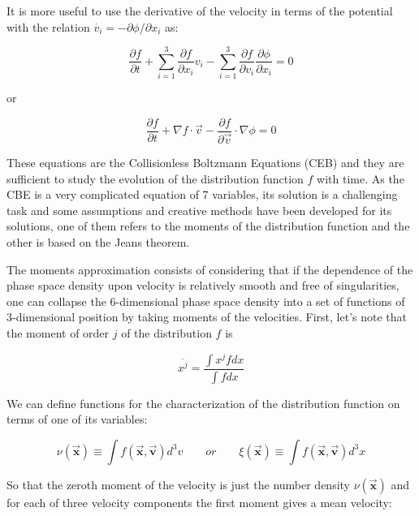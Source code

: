 It is more useful to use the derivative of the velocity in terms of the potential with the relation $\dot{v_{i}}=-\partial\phi / \partial x_{i}$ as:

\begin{equation}
\frac{\partial f}{\partial t}+\sum_{i=1}^{3}\frac{\partial f}{\partial x_{i}}v_{i}-\sum_{i=1}^{3}\frac{\partial f}{\partial v_{i}}\frac{\partial\phi}{\partial x_{i}}=0
\end{equation}

or

\begin{equation}
\frac{\partial f}{\partial t}+\nabla f\cdot\vec{v}-\frac{\partial f}{\partial\overrightarrow{v}}\cdot\nabla\phi=0
\end{equation}

These equations are the Collisionless Boltzmann Equations (CEB) and they are sufficient to study the evolution of the distribution function $f$ with time. As the CBE is a very complicated equation of 7 variables, its solution is a challenging task and some assumptions and creative methods have been developed for its solutions, one of them refers to the moments of the distribution function and the other is based on the Jeans theorem.

The moments approximation consists of considering that if the dependence of the phase space density upon velocity is relatively smooth and free of singularities, one can collapse the 6-dimensional phase space density into a set of functions of 3-dimensional position by taking moments of the velocities. First, let's note that the moment of order $j$ of the distribution $f$ is

\begin{equation}
\overline{x^{j}}=\frac {\int x^{j}fdx}{\int fdx}
\end{equation}

We can define functions for the characterization of the distribution function on terms of one of its variables:

\begin{equation}
\nu(\vec{\textbf{x}})\equiv \int f(\vec{\textbf{x}},\vec{\textbf{v}})d^{3}v\quad\quad or \quad\quad  \xi(\vec{\textbf{x}})\equiv \int f(\vec{\textbf{x}},\vec{\textbf{v}})d^{3}x
\end{equation}

So that the zeroth moment of the velocity is just the number density $\nu(\vec{\textbf{x}})$ and for each of three velocity components the first moment gives a mean velocity:

